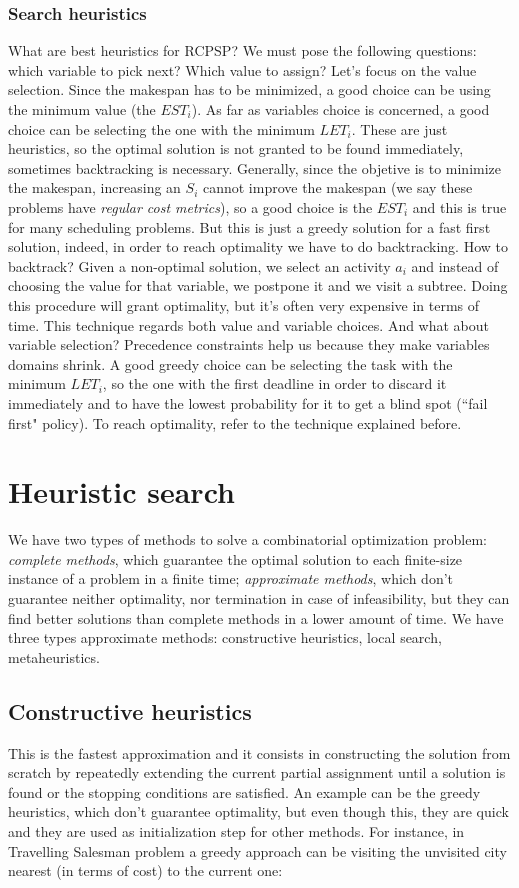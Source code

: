 \documentclass[10pt,a4paper]{article}
\begin{document}
\subsubsection{Search heuristics}
What are best heuristics for RCPSP? We must pose the following questions:
which variable to pick next? Which value to assign? Let's focus on the value
selection. Since the makespan has to be minimized, a good choice can be using
the minimum value (the $EST_i$). As far as variables choice is concerned, a good
choice can be selecting the one with the minimum $LET_i$. These are just
heuristics, so the optimal solution is not granted to be found immediately,
sometimes backtracking is necessary. Generally, since the objetive is to
minimize the makespan, increasing an $S_i$ cannot improve the makespan (we say
these problems have \textit{regular cost metrics}), so a good choice is the
$EST_i$ and this is true for many scheduling problems. But this is just a greedy
solution for a fast first solution, indeed, in order to reach optimality we have
to do backtracking. How to backtrack? Given a non-optimal solution, we select an
activity $a_i$ and instead of choosing the value for that variable, we postpone
it and we visit a subtree. Doing this procedure will grant optimality, but it's
often very expensive in terms of time. This technique regards both value and
variable choices. And what about variable selection? Precedence constraints help
us because they make variables domains shrink. A good greedy choice can be
selecting the task with the minimum $LET_i$, so the one with the first deadline
in order to discard it immediately and to have the lowest probability for it to
get a blind spot (``fail first" policy). To reach optimality, refer to the
technique explained before.

\section{Heuristic search}
We have two types of methods to solve a combinatorial optimization problem:
\textit{complete methods}, which guarantee the optimal solution to each
finite-size instance of a problem in a finite time; \textit{approximate
methods}, which don't guarantee neither optimality, nor termination in case of
infeasibility, but they can find better solutions than complete methods in a
lower amount of time. We have three types approximate methods: constructive
heuristics, local search, metaheuristics.

\subsection{Constructive heuristics}
This is the fastest approximation and it consists in constructing the solution
from scratch by repeatedly extending the current partial assignment until a
solution is found or the stopping conditions are satisfied. An example can be
the greedy heuristics, which don't guarantee optimality, but even though this,
they are quick and they are used as initialization step for other methods. For
instance, in Travelling Salesman problem a greedy approach can be visiting the
unvisited city nearest (in terms of cost) to the current one:
\end{document}
